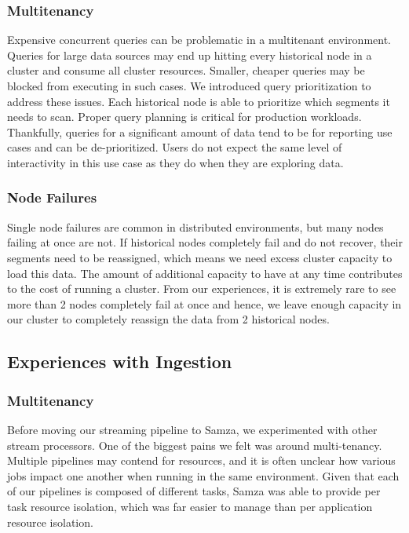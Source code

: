 \documentclass{vldb}
\begin{document}
\subsubsection{Multitenancy}
Expensive concurrent queries can be problematic in a multitenant environment.
Queries for large data sources may end up hitting every historical node in a
cluster and consume all cluster resources. Smaller, cheaper queries may be
blocked from executing in such cases. We introduced query prioritization to
address these issues. Each historical node is able to prioritize which segments
it needs to scan. Proper query planning is critical for production workloads.
Thankfully, queries for a significant amount of data tend to be for reporting
use cases and can be de-prioritized. Users do not expect the same level of
interactivity in this use case as they do when they are exploring data. 

\subsubsection{Node Failures}
Single node failures are common in distributed environments, but many nodes
failing at once are not. If historical nodes completely fail and do not
recover, their segments need to be reassigned, which means we need excess
cluster capacity to load this data. The amount of additional capacity to have
at any time contributes to the cost of running a cluster. From our experiences,
it is extremely rare to see more than 2 nodes completely fail at once and
hence, we leave enough capacity in our cluster to completely reassign the data
from 2 historical nodes. 

\subsection{Experiences with Ingestion}
\subsubsection{Multitenancy}
Before moving our streaming pipeline to Samza, we experimented with other
stream processors. One of the biggest pains we felt was around multi-tenancy. Multiple
pipelines may contend for resources, and it is often unclear how various jobs
impact one another when running in the same environment. Given that each of our
pipelines is composed of different tasks, Samza was able to provide per task
resource isolation, which was far easier to manage than per application
resource isolation.
\end{document}
